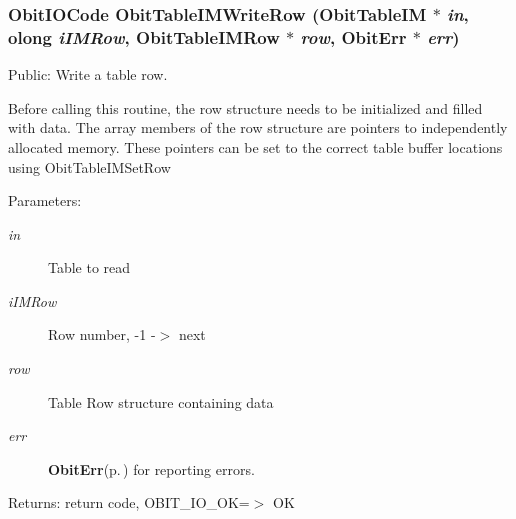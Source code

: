 \subsubsection{\setlength{\rightskip}{0pt plus 5cm}Obit\-IOCode Obit\-Table\-IMWrite\-Row ({\bf Obit\-Table\-IM} $\ast$ {\em in}, {\bf olong} {\em i\-IMRow}, {\bf Obit\-Table\-IMRow} $\ast$ {\em row}, {\bf Obit\-Err} $\ast$ {\em err})}\label{ObitTableIM_8c_a24}


Public: Write a table row. 

Before calling this routine, the row structure needs to be initialized and filled with data. The array members of the row structure are pointers to independently allocated memory. These pointers can be set to the correct table buffer locations using Obit\-Table\-IMSet\-Row \begin{Desc}
\item[Parameters:]
\begin{description}
\item[{\em in}]Table to read \item[{\em i\-IMRow}]Row number, -1 -$>$ next \item[{\em row}]Table Row structure containing data \item[{\em err}]{\bf Obit\-Err}{\rm (p.\,\pageref{structObitErr})} for reporting errors. \end{description}
\end{Desc}
\begin{Desc}
\item[Returns:]return code, OBIT\_\-IO\_\-OK=$>$ OK \end{Desc}
